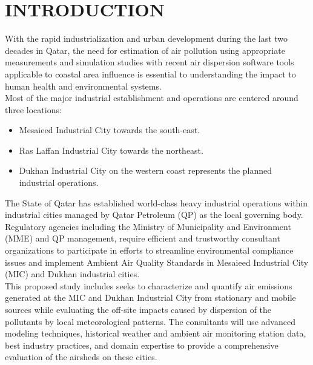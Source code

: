 \chapter{INTRODUCTION}

With the rapid industrialization and urban development during the last two decades in Qatar, the need for estimation of air pollution using appropriate measurements and simulation studies with recent air dispersion software tools applicable to coastal area influence is essential to understanding the impact to human health and environmental systems.\\

Most of the major industrial establishment and operations are centered around three locations:

\begin{itemize}
\item Mesaieed Industrial City towards the south-east.
\item Ras Laffan Industrial City towards the northeast.
\item Dukhan Industrial City on the western coast represents the planned industrial operations.
\end{itemize}

The State of Qatar has established world-class heavy industrial operations within industrial cities managed by Qatar Petroleum (QP) as the local governing body. Regulatory agencies including the Ministry of Municipality and Environment (MME) and QP management, require efficient and trustworthy consultant organizations to participate in efforts to streamline environmental compliance issues and implement Ambient Air Quality Standards in Mesaieed Industrial City (MIC) and Dukhan industrial cities. \\

This proposed study includes seeks to characterize and quantify air emissions generated at the MIC and Dukhan Industrial City from stationary and mobile sources while evaluating the off-site impacts caused by dispersion of the pollutants by local meteorological patterns. The consultants will use advanced modeling techniques, historical weather and ambient air monitoring station data, best industry practices, and domain expertise to provide a comprehensive evaluation of the airsheds on these cities.
